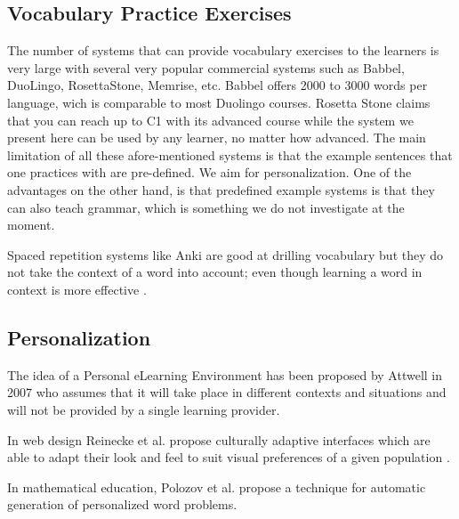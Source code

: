 \subsection{Vocabulary Practice Exercises}
The number of systems that can provide vocabulary exercises to the learners is very large with several very popular commercial systems such as Babbel, DuoLingo, RosettaStone, Memrise, etc. Babbel offers 2000 to 3000 words per language, wich is comparable to most Duolingo courses. Rosetta Stone claims that you can reach up to C1 with its advanced course while the system we present here can be used by any learner, no matter how advanced. The main limitation of all these afore-mentioned systems is that the example sentences that one practices with are pre-defined. We aim for personalization. One of the advantages on the other hand, is that predefined example systems is that they can also teach grammar, which is something we do not investigate at the moment.

Spaced repetition systems like Anki are good at drilling vocabulary but they do not take the context of a word into account; even though learning a word in context is more effective \cite{nagy95-context}.

\subsection{Personalization}

The idea of a Personal eLearning Environment has been proposed by Attwell in 2007 \cite{Atwell07-personal} who assumes that it will take place in different contexts and situations and will not be provided by a single learning provider.

In web design Reinecke et al. propose culturally adaptive interfaces which are able to adapt their look and feel to suit visual preferences of a given population \cite{Reinecke13-CulturalAdaptation}. 

In mathematical education, Polozov et al. propose a technique for automatic generation of personalized word problems\cite{Polozov15-AdaptableMath}.









